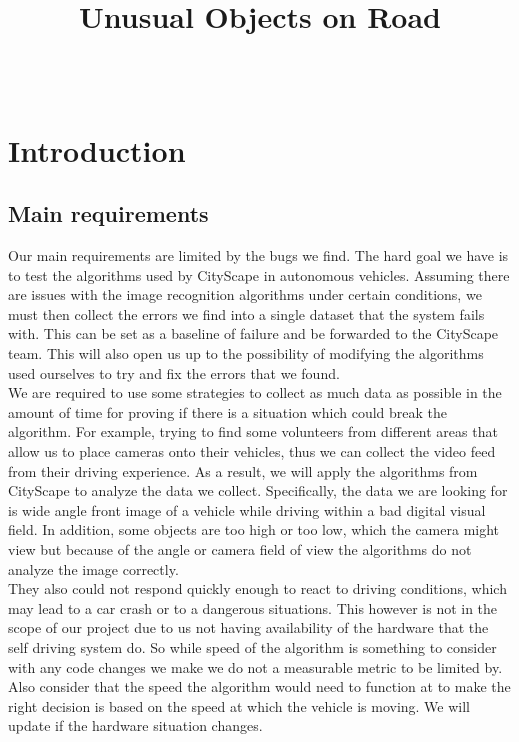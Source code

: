 \documentclass[10pt,draftclsnofoot,onecolumn,journal,compsoc]{IEEEtran}
\title{Unusual Objects on Road}
\author{
  \IEEEauthorblockN{Team (Group 32) name: Teaching AutoPilot to Dodge\\ Basil Al Zamil, Xilun Guo, and Tanner Fry} \\
  \IEEEauthorblockA{CS 461: Senior Capstone Fall 2016 \\ Oregon State University}
}
\date{}
\begin{document}
\maketitle
\IEEEdisplaynontitleabstractindextext
\IEEEpeerreviewmaketitle

\newpage

\tableofcontents

\newpage

\section{Introduction}
    \subsection{Main requirements}

    Our main requirements are limited by the bugs we find. The hard goal we have is to test the algorithms used by CityScape in autonomous vehicles. 
Assuming there are issues with the image recognition algorithms under certain conditions, we must then collect the errors we find into a single dataset that the system fails with. 
    This can be set as a baseline of failure and be forwarded to the CityScape team. 
    This will also open us up to the possibility of modifying the algorithms used ourselves to try and fix the errors that we found. \\
    We are required to use some strategies to collect as much data as possible in the amount of time for proving if there is a situation which could break the algorithm. 
    For example, trying to find some volunteers from different areas that allow us to place cameras onto their vehicles, thus we can collect the video feed from their driving experience. 
    As a result, we will apply the algorithms from CityScape to analyze the data we collect. 
    Specifically, the data we are looking for is wide angle front image of a vehicle while driving within a bad digital visual field. 
    In addition, some objects are too high or too low, which the camera might view but because of the angle or camera field of view the algorithms do not analyze the image correctly. \\
    They also could not respond quickly enough to react to driving conditions, which may lead to a car crash or to a dangerous situations. 
    This however is not in the scope of our project due to us not having availability of the hardware that the self driving system do.
    So while speed of the algorithm is something to consider with any code changes we make we do not a measurable metric to be limited by. 
    Also consider that the speed the algorithm would need to function at to make the right decision is based on the speed at which the  vehicle is moving.
    We will update if the hardware situation changes.
    
\end{document}
